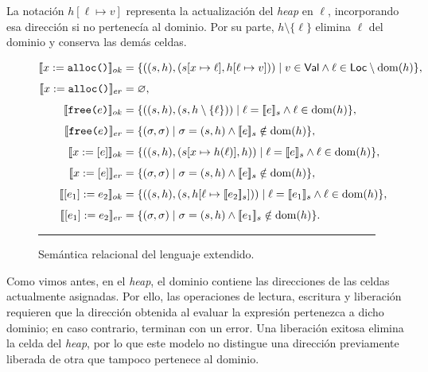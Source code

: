 \documentclass[a4paper,	11pt]{report}
\begin{document}
La notación $h[\ell \mapsto v]$ representa la actualización del \emph{heap} en $\ell$,
incorporando esa dirección si no pertenecía al dominio.
Por su parte,
$h \setminus \{\ell\}$ elimina $\ell$ del dominio y conserva las demás celdas.

\begin{figure}[htbp]
\centering
\begin{minipage}{0.98\textwidth}
\small
$$
\begin{aligned}
\relax[\![x := \texttt{alloc()}]\!]_{ok} &= \{((s, h), (s[x \mapsto \ell], h[\ell \mapsto v]))
  \mid v \in \mathsf{Val} \land \ell \in \mathsf{Loc} \setminus \operatorname{dom}(h)\}, \\[4pt]
[\![x := \texttt{alloc()}]\!]_{er} &= \varnothing, \\[4pt]
[\![\texttt{free(}e\texttt{)}]\!]_{ok} &= \{((s, h), (s, h \setminus \{\ell\}))
  \mid \ell = [\![e]\!]_s \land \ell \in \operatorname{dom}(h)\}, \\[4pt]
[\![\texttt{free(}e\texttt{)}]\!]_{er} &= \{(\sigma, \sigma)
  \mid \sigma = (s, h) \land [\![e]\!]_s \notin \operatorname{dom}(h)\}, \\[4pt]
[\![x := [e]]\!]_{ok} &= \{((s, h), (s[x \mapsto h(\ell)], h))
  \mid \ell = [\![e]\!]_s \land \ell \in \operatorname{dom}(h)\}, \\[4pt]
[\![x := [e]]\!]_{er} &= \{(\sigma, \sigma) \mid \sigma = (s, h) \land [\![e]\!]_s \notin \operatorname{dom}(h)\}, \\[4pt]
[\![[e_1] := e_2]\!]_{ok} &= \{((s, h), (s, h[\ell \mapsto [\![e_2]\!]_s]))
  \mid \ell = [\![e_1]\!]_s \land \ell \in \operatorname{dom}(h)\}, \\[4pt]
[\![[e_1] := e_2]\!]_{er} &= \{(\sigma, \sigma)
  \mid \sigma = (s, h) \land [\![e_1]\!]_s \notin \operatorname{dom}(h)\}.
\end{aligned}
$$
\vspace{0.1em}
\end{minipage}
\rule{\linewidth}{0.4pt}
\caption{Semántica relacional del lenguaje extendido.}
\label{fig:semantica-sl}
\end{figure}

Como vimos antes,
en el \emph{heap},
el dominio contiene las direcciones de las celdas actualmente asignadas.
Por ello,
las operaciones de lectura,
escritura y liberación requieren que la dirección obtenida al evaluar la expresión pertenezca a dicho dominio;
en caso contrario,
terminan con un error.
Una liberación exitosa elimina la celda del \emph{heap},
por lo que este modelo no distingue una dirección previamente liberada de otra que tampoco pertenece al dominio.
\end{document}
